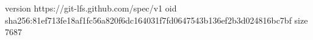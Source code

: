 version https://git-lfs.github.com/spec/v1
oid sha256:81ef713fe18af1fc56a820f6dc164031f7fd0647543b136ef2b3d024816bc7bf
size 7687
